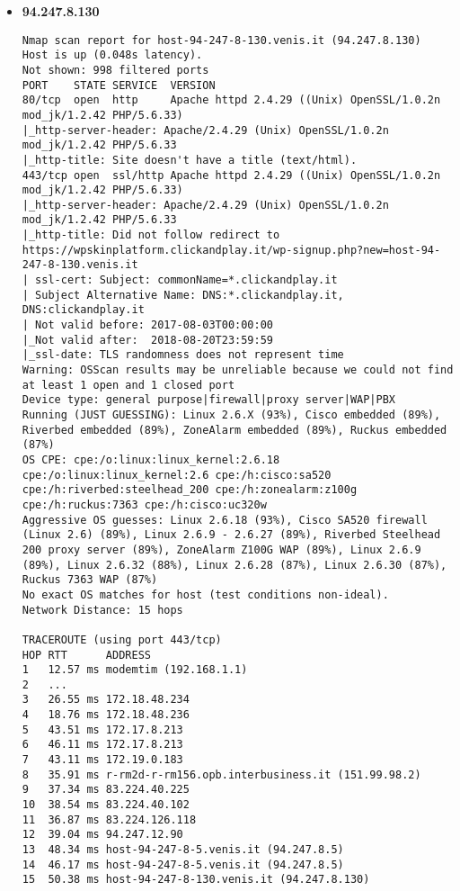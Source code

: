     \begin{itemize}
      \item \textbf{94.247.8.130}
\begin{verbatim}
Nmap scan report for host-94-247-8-130.venis.it (94.247.8.130)
Host is up (0.048s latency).
Not shown: 998 filtered ports
PORT    STATE SERVICE  VERSION
80/tcp  open  http     Apache httpd 2.4.29 ((Unix) OpenSSL/1.0.2n mod_jk/1.2.42 PHP/5.6.33)
|_http-server-header: Apache/2.4.29 (Unix) OpenSSL/1.0.2n mod_jk/1.2.42 PHP/5.6.33
|_http-title: Site doesn't have a title (text/html).
443/tcp open  ssl/http Apache httpd 2.4.29 ((Unix) OpenSSL/1.0.2n mod_jk/1.2.42 PHP/5.6.33)
|_http-server-header: Apache/2.4.29 (Unix) OpenSSL/1.0.2n mod_jk/1.2.42 PHP/5.6.33
|_http-title: Did not follow redirect to https://wpskinplatform.clickandplay.it/wp-signup.php?new=host-94-247-8-130.venis.it
| ssl-cert: Subject: commonName=*.clickandplay.it
| Subject Alternative Name: DNS:*.clickandplay.it, DNS:clickandplay.it
| Not valid before: 2017-08-03T00:00:00
|_Not valid after:  2018-08-20T23:59:59
|_ssl-date: TLS randomness does not represent time
Warning: OSScan results may be unreliable because we could not find at least 1 open and 1 closed port
Device type: general purpose|firewall|proxy server|WAP|PBX
Running (JUST GUESSING): Linux 2.6.X (93%), Cisco embedded (89%), Riverbed embedded (89%), ZoneAlarm embedded (89%), Ruckus embedded (87%)
OS CPE: cpe:/o:linux:linux_kernel:2.6.18 cpe:/o:linux:linux_kernel:2.6 cpe:/h:cisco:sa520 cpe:/h:riverbed:steelhead_200 cpe:/h:zonealarm:z100g cpe:/h:ruckus:7363 cpe:/h:cisco:uc320w
Aggressive OS guesses: Linux 2.6.18 (93%), Cisco SA520 firewall (Linux 2.6) (89%), Linux 2.6.9 - 2.6.27 (89%), Riverbed Steelhead 200 proxy server (89%), ZoneAlarm Z100G WAP (89%), Linux 2.6.9 (89%), Linux 2.6.32 (88%), Linux 2.6.28 (87%), Linux 2.6.30 (87%), Ruckus 7363 WAP (87%)
No exact OS matches for host (test conditions non-ideal).
Network Distance: 15 hops

TRACEROUTE (using port 443/tcp)
HOP RTT      ADDRESS
1   12.57 ms modemtim (192.168.1.1)
2   ...
3   26.55 ms 172.18.48.234
4   18.76 ms 172.18.48.236
5   43.51 ms 172.17.8.213
6   46.11 ms 172.17.8.213
7   43.11 ms 172.19.0.183
8   35.91 ms r-rm2d-r-rm156.opb.interbusiness.it (151.99.98.2)
9   37.34 ms 83.224.40.225
10  38.54 ms 83.224.40.102
11  36.87 ms 83.224.126.118
12  39.04 ms 94.247.12.90
13  48.34 ms host-94-247-8-5.venis.it (94.247.8.5)
14  46.17 ms host-94-247-8-5.venis.it (94.247.8.5)
15  50.38 ms host-94-247-8-130.venis.it (94.247.8.130)


\end{verbatim}
\end{itemize}
